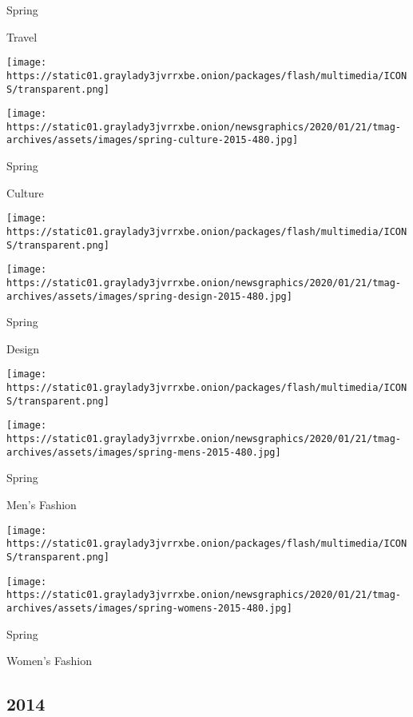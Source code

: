 Spring

Travel

\href{https://www.nytimes3xbfgragh.onion/indexes/2015/04/12/t-magazine/design-issue/index.html}{}

\texttt{[image: https://static01.graylady3jvrrxbe.onion/packages/flash/multimedia/ICONS/transparent.png]}

\texttt{[image: https://static01.graylady3jvrrxbe.onion/newsgraphics/2020/01/21/tmag-archives/assets/images/spring-culture-2015-480.jpg]}

Spring

Culture

\href{https://www.nytimes3xbfgragh.onion/indexes/2015/03/29/t-magazine/design-issue/index.html}{}

\texttt{[image: https://static01.graylady3jvrrxbe.onion/packages/flash/multimedia/ICONS/transparent.png]}

\texttt{[image: https://static01.graylady3jvrrxbe.onion/newsgraphics/2020/01/21/tmag-archives/assets/images/spring-design-2015-480.jpg]}

Spring

Design

\href{https://www.nytimes3xbfgragh.onion/indexes/2015/03/08/t-magazine/mens-fashion-issue/index.html}{}

\texttt{[image: https://static01.graylady3jvrrxbe.onion/packages/flash/multimedia/ICONS/transparent.png]}

\texttt{[image: https://static01.graylady3jvrrxbe.onion/newsgraphics/2020/01/21/tmag-archives/assets/images/spring-mens-2015-480.jpg]}

Spring

Men's Fashion

\href{https://www.nytimes3xbfgragh.onion/indexes/2015/02/15/t-magazine/womens-fashion-issue/index.html}{}

\texttt{[image: https://static01.graylady3jvrrxbe.onion/packages/flash/multimedia/ICONS/transparent.png]}

\texttt{[image: https://static01.graylady3jvrrxbe.onion/newsgraphics/2020/01/21/tmag-archives/assets/images/spring-womens-2015-480.jpg]}

Spring

Women's Fashion

\hypertarget{2014}{%
\subsection{2014}\label{2014}}

